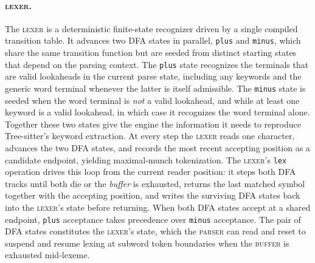 \documentclass[11pt]{article}
\theoremstyle{plain}
\theoremstyle{definition}
\begin{document}
\paragraph{\textsc{lexer}.} The \textsc{lexer} is a deterministic finite-state
recognizer driven by a single compiled transition table. It advances two DFA
states in parallel, \texttt{plus} and \texttt{minus}, which share the same
transition function but are seeded from distinct starting states that depend on
the parsing context. The \texttt{plus} state recognizes the terminals that are
valid lookaheads in the current parse state, including any keywords and the
generic word terminal whenever the latter is itself admissible. The
\texttt{minus} state is seeded when the word terminal is \emph{not} a valid
lookahead, and while at least one keyword is a valid lookahead, in which case it
recognizes the word terminal alone. Together these two states give the engine
the information it needs to reproduce Tree-sitter's keyword extraction. At every
step the \textsc{lexer} reads one character, advances the two DFA states, and
records the most recent accepting position as a candidate endpoint, yielding
maximal-munch tokenization. The \textsc{lexer}'s \texttt{lex} operation drives
this loop from the current reader position: it steps both DFA tracks until both
die or the \emph{buffer} is exhausted, returns the last matched symbol together
with the accepting position, and writes the surviving DFA states back into the
\textsc{lexer}'s state before returning. When both DFA states accept at a shared
endpoint, \texttt{plus} acceptance takes precedence over \texttt{minus}
acceptance. The pair of DFA states constitutes the \textsc{lexer}'s state, which
the \textsc{parser} can read and reset to suspend and resume lexing at subword
token boundaries when the \textsc{buffer} is exhausted mid-lexeme.
\end{document}
